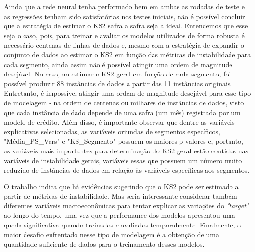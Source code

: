 Ainda que a rede neural tenha performado bem em ambas as rodadas de teste e as regressões tenham sido satisfatórias nos testes iniciais, não é possível concluir que a estratégia de estimar o KS2 safra a safra seja a  ideal. Entendemos que esse seja o caso, pois, para treinar e avaliar os modelos utilizados de forma robusta é necessário centenas de linhas de dados e, mesmo com a estratégia de expandir o conjunto de dados ao estimar o KS2 em função das métricas de instabilidade para cada segmento, ainda assim não é possível atingir uma ordem de magnitude desejável. No caso, ao estimar o KS2 geral em função de cada segmento, foi possível produzir 88 instâncias de dados a partir das 11 instâncias originais. Entretanto, é impossível atingir uma ordem de magnitude desejável para esse tipo de modelagem - na ordem de centenas ou milhares de instâncias de dados, visto que cada instância de dado depende de uma safra (um mês) registrada por um modelo de crédito. Além disso, é importante observar que dentre as variáveis explicativas selecionadas, as variáveis oriundas de segmentos específicos, "Média\_PS\_Vars" e "KS\_Segmento" possuem os maiores p-valores e, portanto, as variáveis mais importantes para determinação do KS2 geral estão contidas nas variáveis de instabilidade gerais, variáveis essas que possuem um número muito reduzido de instâncias de dados em relação às variáveis específicas aos segmentos.

O trabalho indica que há evidências sugerindo que o KS2 pode ser estimado a partir de métricas de instabilidade. Mas seria interessante considerar também diferentes variáveis macroeconômicas para tentar explicar as variações  do \emph{"target"} ao longo do tempo, uma vez que a performance dos modelos apresentou uma queda significativa quando treinados e avaliados temporalmente. Finalmente, o maior desafio enfrentado nesse tipo de modelagem é a obtenção de uma quantidade suficiente de dados para o treinamento desses modelos.